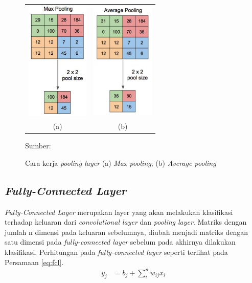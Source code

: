     \begin{figure}[H]
        \centering
        \begin{tabular}{cc}
            \includegraphics[width=3cm]{../img/CNN Max Pooling - Latex.PNG}
            &
            \includegraphics[width=3cm]{../img/CNN Average Pooling - Latex.PNG}\\
            (a) &(b)\\
        \end{tabular}
        \caption{Cara kerja \textit{pooling layer} (a) \textit{Max pooling}; (b) \textit{Average pooling}}
        \label{fig:pooling}
        Sumber: \citep{Yani2019}
    \end{figure}

    \subsection{\textit{Fully-Connected Layer}}
    \textit{Fully-Connected Layer} merupakan layer yang akan melakukan klasifikasi terhadap keluaran dari \textit{convolutional layer} dan \textit{pooling layer}. Matriks dengan jumlah n dimensi pada keluaran sebelumnya, diubah menjadi matriks dengan satu dimensi pada \textit{fully-connected layer} sebelum pada akhirnya dilakukan klasifikasi. Perhitungan pada \textit{fully-connected layer} seperti terlihat pada Persamaan \ref{eq:fcl}.
    \begin{align}
        y_j &= b_j + \sum^{n}_{i} w_{ij}x_i
        \label{eq:fcl}
    \end{align}

